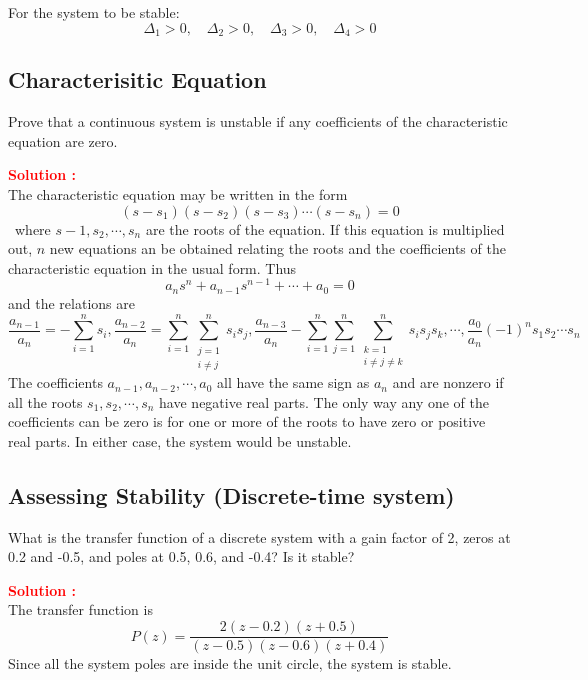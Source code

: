 \documentclass[12pt]{article}
\begin{document}
For the system to be stable:
\[
\Delta_1 > 0, \quad \Delta_2 > 0, \quad \Delta_3 > 0, \quad \Delta_4 > 0
\]

\clearpage
\subsection{Characterisitic Equation}


Prove that a continuous system is unstable if any coefficients of the characteristic equation are zero.

\textbf{\textcolor{red}{Solution :}} \\
The characteristic equation may be written in the form
\begin{equation}
    (s-s_1)(s-s_2)(s-s_3)\cdots (s-s_n) = 0
\end{equation}\
where \(s-1,s_2,\cdots,s_n\) are the roots of the equation. If this equation is multiplied out, \(n\) new equations an be obtained relating the roots and the coefficients of the characteristic equation in the usual form. Thus
\begin{equation}
    a_n s^n + a_{n-1}s^{n-1} + \cdots + a_0 = 0
\end{equation}
and the relations are 
\begin{equation}
    \frac{a_{n-1}}{a_n} = - \sum_{i=1}^n s_i, \frac{a_{n-2}}{a_n} =  \sum_{i=1}^n \sum_{\substack{j=1 \\ i \neq j}}^n s_i s_j,\frac{a_{n-3}}{a_n} - \sum_{i=1}^n \sum_{j=1}^n \sum_{\substack{k=1 \\ i \neq j \neq k}}^n s_i s_j s_k, \cdots,\frac{a_0}{a_n}(-1)^n s_1 s_2 \cdots s_n
\end{equation}
The coefficients \(a_{n-1},a_{n-2},\cdots,a_0\) all have the same sign as \(a_n\) and are nonzero if all the roots \(s_1,s_2,\cdots,s_n\) have negative real parts. The only way any one of the coefficients can be zero is for one or more of the roots to have zero or positive real parts. In either case, the system would be unstable.

\clearpage
\subsection{Assessing Stability (Discrete-time system)}

What is the transfer function of a discrete system with a gain factor of 2, zeros at 0.2 and -0.5, and poles at 0.5, 0.6, and -0.4? Is it stable?

\textbf{\textcolor{red}{Solution :}} \\
The transfer function is
\[ P(z) = \frac{2(z - 0.2)(z + 0.5)}{(z - 0.5)(z - 0.6)(z + 0.4)} \]
Since all the system poles are inside the unit circle, the system is stable.
\end{document}
